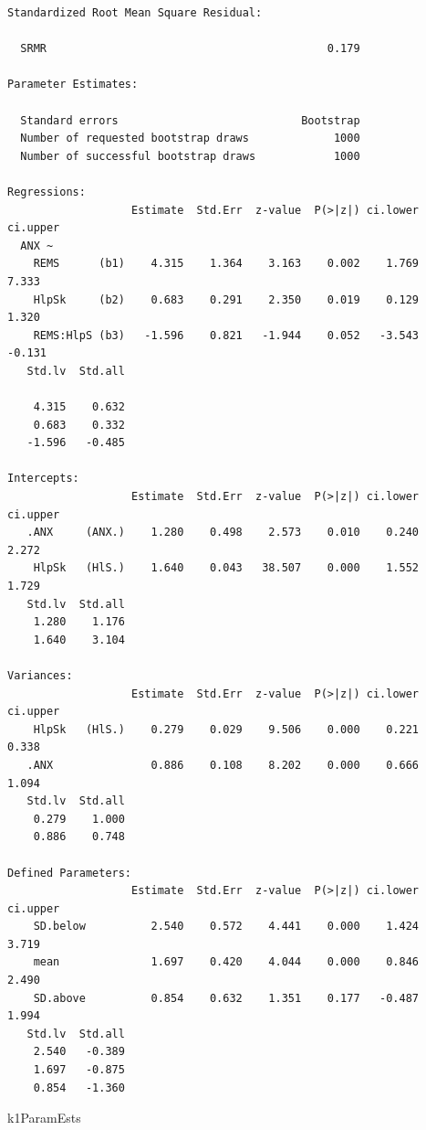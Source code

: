 \documentclass[
  11pt,
]{book}
\newenvironment{Shaded}{\begin{snugshade}}{\end{snugshade}}
\newcommand{\NormalTok}[1]{#1}
\begin{document}
\begin{verbatim}
Standardized Root Mean Square Residual:

  SRMR                                           0.179

Parameter Estimates:

  Standard errors                            Bootstrap
  Number of requested bootstrap draws             1000
  Number of successful bootstrap draws            1000

Regressions:
                   Estimate  Std.Err  z-value  P(>|z|) ci.lower ci.upper
  ANX ~                                                                 
    REMS      (b1)    4.315    1.364    3.163    0.002    1.769    7.333
    HlpSk     (b2)    0.683    0.291    2.350    0.019    0.129    1.320
    REMS:HlpS (b3)   -1.596    0.821   -1.944    0.052   -3.543   -0.131
   Std.lv  Std.all
                  
    4.315    0.632
    0.683    0.332
   -1.596   -0.485

Intercepts:
                   Estimate  Std.Err  z-value  P(>|z|) ci.lower ci.upper
   .ANX     (ANX.)    1.280    0.498    2.573    0.010    0.240    2.272
    HlpSk   (HlS.)    1.640    0.043   38.507    0.000    1.552    1.729
   Std.lv  Std.all
    1.280    1.176
    1.640    3.104

Variances:
                   Estimate  Std.Err  z-value  P(>|z|) ci.lower ci.upper
    HlpSk   (HlS.)    0.279    0.029    9.506    0.000    0.221    0.338
   .ANX               0.886    0.108    8.202    0.000    0.666    1.094
   Std.lv  Std.all
    0.279    1.000
    0.886    0.748

Defined Parameters:
                   Estimate  Std.Err  z-value  P(>|z|) ci.lower ci.upper
    SD.below          2.540    0.572    4.441    0.000    1.424    3.719
    mean              1.697    0.420    4.044    0.000    0.846    2.490
    SD.above          0.854    0.632    1.351    0.177   -0.487    1.994
   Std.lv  Std.all
    2.540   -0.389
    1.697   -0.875
    0.854   -1.360
\end{verbatim}

\begin{Shaded}
\begin{Highlighting}[]
\NormalTok{k1ParamEsts}
\end{Highlighting}
\end{Shaded}
\end{document}
